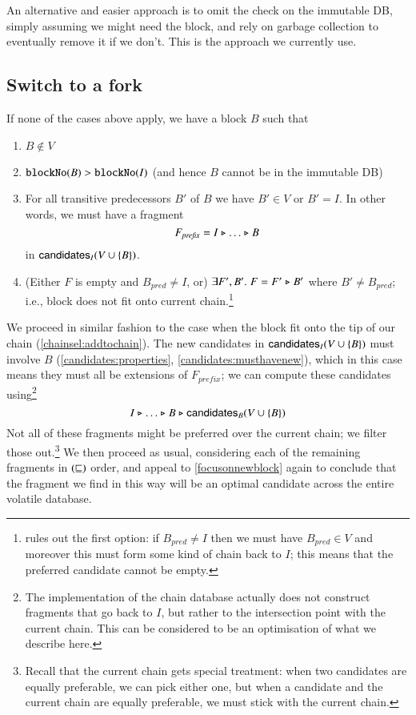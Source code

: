 An alternative and easier approach is to omit the check on the immutable DB,
simply assuming we might need the block, and rely on garbage collection to
eventually remove it if we don't. This is the approach we currently use.

\subsection{Switch to a fork}
\label{chainsel:switchtofork}

If none of the cases above apply, we have a block $B$ such that

\begin{enumerate}
\item \label{chainsel:switchtofork:notinvoldb}
$B \notin V$
\item \label{chainsel:switchtofork:notinimmdb}
$\mathtt{blockNo}(B) > \mathtt{blockNo}(I)$ (and hence $B$ cannot be in the immutable DB)
\item \label{chainsel:switchtofork:connected}
For all transitive predecessors $B'$ of $B$ we have $B' \in V$ or $B' = I$.
In other words, we must have a fragment
$$F_\mathit{prefix} = I \mathrel{\triangleright} \ldots \mathrel{\triangleright} B$$
in $\mathsf{candidates}_I(V \cup \{B\})$.
\item \label{chainsel:switchtofork:doesnotfit}
(Either $F$ is empty and $B_\mathit{pred} \neq I$, or) $\exists F', B' .\;
F = F' \mathrel{\triangleright} B'$ where $B' \neq B_\mathit{pred}$; i.e., block does not fit onto
current chain.\footnote{ rules out the
first option: if $B_\mathit{pred} \neq I$ then we must have $B_\mathit{pred} \in
V$ and moreover this must form some kind of chain back to $I$; this means that
the preferred candidate cannot be empty.}
\end{enumerate}

We proceed in similar fashion to the case when the block fit onto the tip of our
chain (\cref{chainsel:addtochain}). The new candidates in $\mathsf{candidates}_I(V \cup
\{B\})$ must involve $B$ (\cref{candidates:properties},
\cref{candidates:musthavenew}), which in this case means they must all be
extensions of $F_\mathit{prefix}$; we can compute these candidates
using\footnote{The implementation of the chain database actually does not
construct fragments that go back to $I$, but rather to the intersection point
with the current chain. This can be considered to be an optimisation of what we
describe here.}
$$I \mathrel{\triangleright} \ldots \mathrel{\triangleright} B \mathrel{\triangleright} \mathsf{candidates}_B(V \cup \{B\})$$
Not all of these fragments might be preferred over the current chain; we filter
those out.\footnote{Recall that the current chain gets special treatment: when
two candidates are equally preferable, we can pick either one, but when a
candidate and the current chain are equally preferable, we must stick with the
current chain.} We then proceed as usual, considering each of the remaining
fragments in $(\mathrel{\sqsubseteq})$ order, and appeal to \cref{focusonnewblock}
again to conclude that the fragment we find in this way will be an optimal
candidate across the entire volatile database.


